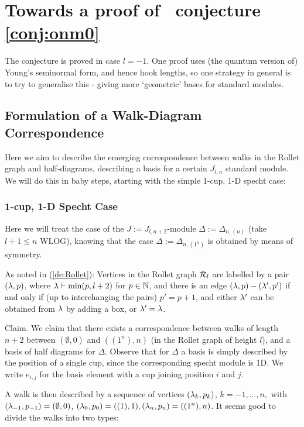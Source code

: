 \section{Towards a proof of \ournotmain\ conjecture \ref{conj:onm0}}

The conjecture is proved in case $l=-1$. One proof uses (the quantum version of) Young's seminormal form, and hence hook lengths, 
so one strategy in general is to try to generalise this - giving more `geometric' 
bases for standard modules. 

\subsection{Formulation of a %
Walk-Diagram Correspondence}
Here we aim to describe the emerging correspondence between walks in the Rollet graph and half-diagrams, describing a basis for a certain $J_{l,n}$ standard module. We will do this in baby steps, starting with the simple 1-cup, 1-D specht case:

\subsubsection{1-cup, 1-D Specht Case}
Here we will treat the case of the $J:=J_{l,n+2}$-module $\Delta:=\Delta_{n,(n)}$ (take $l+1\leq n$ WLOG), knowing that the case $\Delta:=\Delta_{n,(1^n)}$ is obtained by means of symmetry. 


As noted in (\ref{de:Rollet}):
Vertices in the Rollet graph  ${\mathcal{R}}_l$ are labelled by a pair $(\lambda, p)$, where $\lambda\vdash \min(p,l+2)$ for $p\in \mathbb{N}$, and there is an edge $(\lambda, p)-(\lambda', p')$ if and only if (up to interchanging the pairs) $p'=p+1$, and either $\lambda'$ can be obtained from $\lambda$ by adding a box, or $\lambda'=\lambda$.


\mdef Claim.  
We claim that there exists a correspondence between walks of length $n+2$ between $(\emptyset,0)$ and $((1^n),n)$ (in the Rollet graph of height $l$), and a basis of half diagrams for $\Delta$. Observe that for $\Delta$ a basis is simply described by the position of a single cup, since the corresponding specht module is 1D. We write $e_{i,j}$ for the basis element with a cup joining position $i$ and $j$. 

A walk is then described by a sequence of vertices $(\lambda_k, p_k)$, $k=-1, \dots, n,$ with $(\lambda_{-1}, p_{-1})=(\emptyset,0)$, $(\lambda_0, p_0)=((1),1), (\lambda_{n}, p_{n})=((1^n), n)$. It seems good to divide the walks into two types: 

